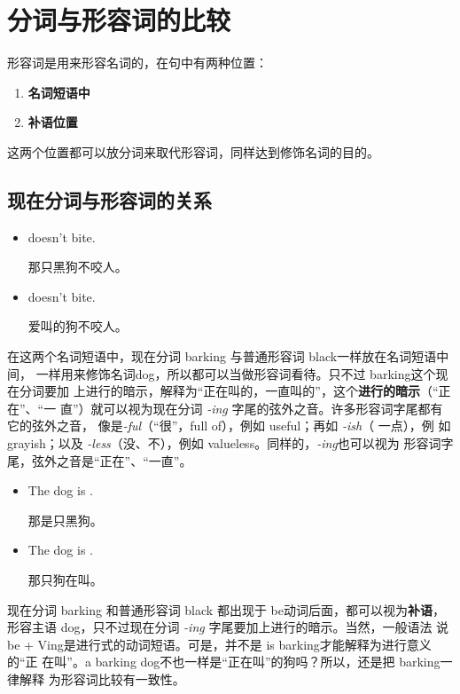 \section{分词与形容词的比较}

形容词是用来形容名词的，在句中有两种位置：

\begin{enumerate}
\item  \textbf{名词短语中}
\item  \textbf{补语位置}
\end{enumerate}

这两个位置都可以放分词来取代形容词，同样达到修饰名词的目的。

\subsection{现在分词与形容词的关系}
\begin{itemize}
\item {} doesn't bite.

  那只黑狗不咬人。
\item {} doesn't bite.

爱叫的狗不咬人。
\end{itemize}

在这两个名词短语中，现在分词 barking 与普通形容词 black一样放在名词短语中间，
一样用来修饰名词dog，所以都可以当做形容词看待。只不过 barking这个现在分词要加
上进行的暗示，解释为“正在叫的，一直叫的”，这个\textbf{进行的暗示}（“正在”、“一
直”）就可以视为现在分词 \emph{-ing} 字尾的弦外之音。许多形容词字尾都有它的弦外之音，
像是\emph{-ful}（“很”，full of），例如 useful；再如 \emph{-ish}（ 一点），例
如grayish；以及 \emph{-less}（没、不），例如 valueless。同样的，\emph{-ing}也可以视为
形容词字尾，弦外之音是“正在”、“一直”。

\begin{itemize}
\item The dog is .

那是只黑狗。
\item The dog is .

那只狗在叫。
\end{itemize}

现在分词 barking 和普通形容词 black 都出现于 be动词后面，都可以视为\textbf{补语}，
形容主语 dog，只不过现在分词 \emph{-ing} 字尾要加上进行的暗示。当然，一般语法
说 be + Ving是进行式的动词短语。可是，并不是 is barking才能解释为进行意义的“正
在叫”。a barking dog不也一样是“正在叫”的狗吗？所以，还是把 barking一律解释
为形容词比较有一致性。

